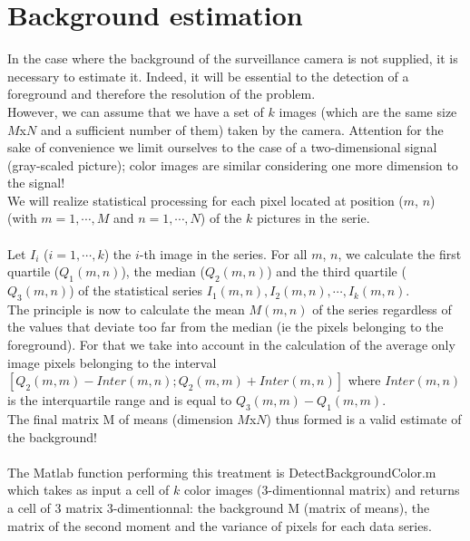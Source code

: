 \section{Background estimation}

In the case where the background of the surveillance camera is not supplied, it is necessary to estimate it. Indeed, it will be essential to the detection of a foreground and therefore the resolution of the problem.
\\
However, we can assume that we have a set of $k$ images (which are the same size $M$x$N$ and a sufficient number of them) taken by the camera. Attention for the sake of convenience we limit ourselves to the case of a two-dimensional signal (gray-scaled picture); color images are similar considering one more dimension to the signal!
\\
We will realize statistical processing for each pixel located at position ($m$, $n$) (with $m =1, \cdots, M$ and $n=1, \cdots, N$) of the $k$ pictures in the serie.
\\
\\
Let $I_i$ ($i=1,\cdots,k$) the $i$-th image in the series. For all $m$, $n$, we calculate the first quartile ($Q_1 (m, n)$), the median ($Q_2 (m, n) $) and the third quartile ($Q_3(m, n)$) of the statistical series $I_1(m, n), I_2(m, n), \cdots, I_k(m, n)$.
\\
The principle is now to calculate the mean $M(m, n)$ of the series regardless of the values ​​that deviate too far from the median (ie the pixels belonging to the foreground). For that we take into account in the calculation of the average only image pixels belonging to the interval $[Q_2 (m, m) - Inter (m, n); Q_2 (m, m) + Inter (m, n) ]$ where $Inter (m, n)$ is the interquartile range and is equal to $Q_3 (m, m) - Q_1 (m, m)$.
\\
The final matrix M of means (dimension $M$x$N$) thus formed  is a valid estimate of the background!
\\
\\
The Matlab function performing this treatment is DetectBackgroundColor.m which takes as input a cell of $ k$ color images (3-dimentionnal matrix) and returns a cell of 3 matrix 3-dimentionnal: the background M (matrix of means), the matrix of the second moment and the variance of pixels for each data series.
